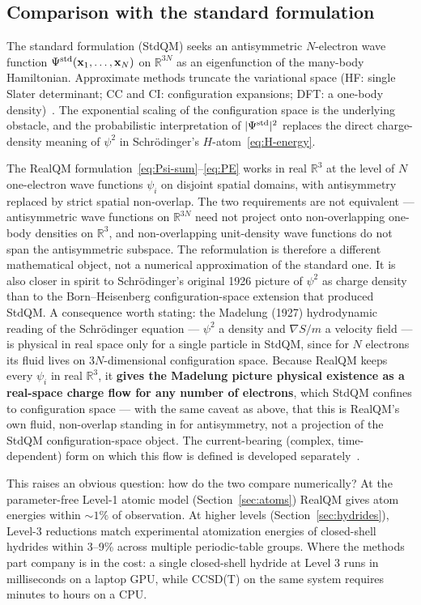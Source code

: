 \documentclass[11pt]{article}
\begin{document}
\subsection{Comparison with the standard formulation}

The standard formulation (StdQM) seeks an antisymmetric $N$-electron wave function $\Psi^{\rm std}(\mathbf{x}_1, \ldots, \mathbf{x}_N)$ on $\mathbb{R}^{3N}$ as an eigenfunction of the many-body Hamiltonian. Approximate methods truncate the variational space (HF: single Slater determinant; CC and CI: configuration expansions; DFT: a one-body density)~\cite{KS65,MHG17}. The exponential scaling of the configuration space is the underlying obstacle, and the probabilistic interpretation of $|\Psi^{\rm std}|^2$ replaces the direct charge-density meaning of $\psi^2$ in Schr\"odinger's $H$-atom~\eqref{eq:H-energy}.

The RealQM formulation~\eqref{eq:Psi-sum}--\eqref{eq:PE} works in real $\mathbb{R}^3$ at the level of $N$ one-electron wave functions $\psi_i$ on disjoint spatial domains, with antisymmetry replaced by strict spatial non-overlap. The two requirements are not equivalent --- antisymmetric wave functions on $\mathbb{R}^{3N}$ need not project onto non-overlapping one-body densities on $\mathbb{R}^3$, and non-overlapping unit-density wave functions do not span the antisymmetric subspace. The reformulation is therefore a different mathematical object, not a numerical approximation of the standard one. It is also closer in spirit to Schr\"odinger's original 1926 picture of $\psi^2$ as charge density than to the Born--Heisenberg configuration-space extension that produced StdQM. A consequence worth stating: the Madelung (1927) hydrodynamic reading of the Schr\"odinger equation --- $\psi^2$ a density and $\nabla S/m$ a velocity field --- is physical in real space only for a single particle in StdQM, since for $N$ electrons its fluid lives on $3N$-dimensional configuration space. Because RealQM keeps every $\psi_i$ in real $\mathbb{R}^3$, it \textbf{gives the Madelung picture physical existence as a real-space charge flow for any number of electrons}, which StdQM confines to configuration space --- with the same caveat as above, that this is RealQM's own fluid, non-overlap standing in for antisymmetry, not a projection of the StdQM configuration-space object. The current-bearing (complex, time-dependent) form on which this flow is defined is developed separately~\cite{ComplexRealQM}.

This raises an obvious question: how do the two compare numerically? At the parameter-free Level-1 atomic model (Section~\ref{sec:atoms}) RealQM gives atom energies within ${\sim}1\%$ of observation. At higher levels (Section~\ref{sec:hydrides}), Level-3 reductions match experimental atomization energies of closed-shell hydrides within 3--9\% across multiple periodic-table groups. Where the methods part company is in the cost: a single closed-shell hydride at Level 3 runs in milliseconds on a laptop GPU, while CCSD(T) on the same system requires minutes to hours on a CPU.
\end{document}
